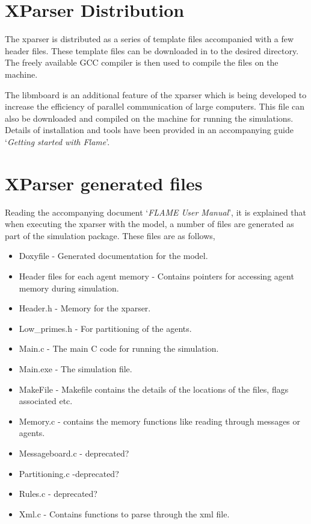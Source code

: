 
\section{XParser Distribution}
The xparser is distributed as a series of template files accompanied with a few header files. These template files can be downloaded in to the desired directory. The freely available GCC compiler is then used to compile the files on the machine.

The libmboard is an additional feature of the xparser which is being developed to increase the efficiency of parallel communication of large computers. This file can also be downloaded and compiled on the machine for running the simulations. Details of installation and tools have been provided in an accompanying guide `\emph{Getting started with Flame}'.

\section{XParser generated files}
Reading the accompanying document `\emph{FLAME User Manual}', it is explained that when executing the xparser with the model, a number of files are generated as part of the simulation package. These files are as follows,

\begin{itemize}
\item Doxyfile - Generated documentation for the model.
\item Header files for each agent memory - Contains pointers for accessing agent memory during simulation.
\item Header.h  - Memory for the xparser.
\item Low\_primes.h - For partitioning of the agents.
\item Main.c - The main C code for running the simulation.
\item Main.exe - The simulation file.
\item MakeFile - Makefile contains the details of the locations of the files, flags associated etc.
\item Memory.c - contains the memory functions like reading through messages or agents.
\item Messageboard.c - deprecated?
\item Partitioning.c -deprecated?
\item Rules.c - deprecated?
\item Xml.c - Contains functions to parse through the xml file.
\end{itemize}

